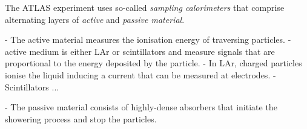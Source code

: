 

The ATLAS experiment uses so-called \emph{sampling calorimeters} that comprise alternating layers of \emph{active} and \emph{passive material}.

- The active material measures the ionisation energy of traversing particles. 
- active medium is either LAr or scintillators and measure signals that are proportional to the energy deposited by the particle.
- In LAr, charged particles ionise the liquid inducing a current that can be measured at electrodes. 
- Scintillators ...

- The passive material consists of highly-dense absorbers that initiate the showering process and stop the particles.  






